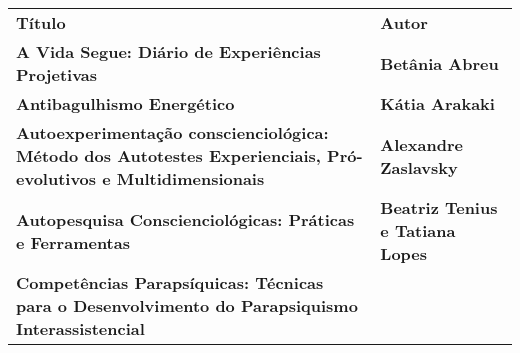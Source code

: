 \begin{longtable}[]{@{}
  >{\raggedright\arraybackslash}p{}
  >{\raggedright\arraybackslash}p{}@{}}
\toprule\noalign{}
\begin{minipage}[b]{\linewidth}\centering
\textbf{Título}
\end{minipage} & \begin{minipage}[b]{\linewidth}\centering
\textbf{Autor}
\end{minipage} \\
\begin{minipage}[b]{\linewidth}\raggedright
\textbf{A Vida Segue: Diário de Experiências Projetivas}
\end{minipage} & \begin{minipage}[b]{\linewidth}\raggedright
\textbf{Betânia Abreu}
\end{minipage} \\
\begin{minipage}[b]{\linewidth}\raggedright
\textbf{Antibagulhismo Energético}
\end{minipage} & \begin{minipage}[b]{\linewidth}\raggedright
\textbf{Kátia Arakaki}
\end{minipage} \\
\begin{minipage}[b]{\linewidth}\raggedright
\textbf{Autoexperimentação conscienciológica: Método dos Autotestes Experienciais, Pró-evolutivos e Multidimensionais}
\end{minipage} & \begin{minipage}[b]{\linewidth}\raggedright
\textbf{Alexandre Zaslavsky}
\end{minipage} \\
\begin{minipage}[b]{\linewidth}\raggedright
\textbf{Autopesquisa Conscienciológicas: Práticas e Ferramentas}
\end{minipage} & \begin{minipage}[b]{\linewidth}\raggedright
\textbf{Beatriz Tenius e Tatiana Lopes}
\end{minipage} \\
\begin{minipage}[b]{\linewidth}\raggedright
\textbf{Competências Parapsíquicas: Técnicas para o Desenvolvimento do Parapsiquismo Interassistencial}
\end{minipage} & \begin{minipage}[b]{\linewidth}\raggedright

\end{minipage}
\end{longtable}
